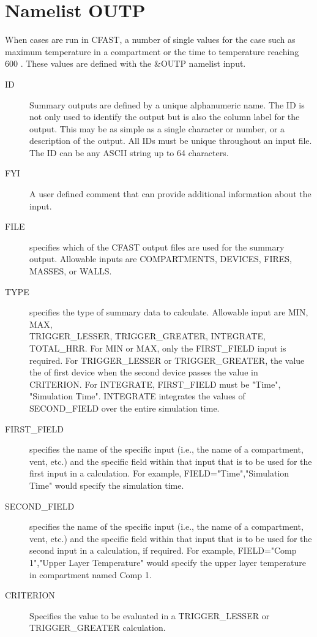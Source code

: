 \documentclass[12pt,twoside]{book}
\begin{document}
\section{Namelist OUTP}

When cases are run in CFAST, a number of single values for the case such as maximum temperature in a compartment or the time to temperature reaching 600 \degc. These values are defined with the {\ct \&OUTP} namelist input.

\begin{description}
  \item[ID] Summary outputs are defined by a unique alphanumeric name. The ID is not only used to identify the output but is also the column label for the output. This may be as simple as a single character or number, or a description of the output. All IDs must be unique throughout an input file.  The { \ct ID} can be any ASCII string up to 64 characters.
  \item[FYI] A user defined comment that can provide additional information about the input.
  \item[FILE] specifies which of the CFAST output files are used for the summary output. Allowable inputs are {\ct COMPARTMENTS}, {\ct DEVICES}, {\ct FIRES}, {\ct MASSES}, or {\ct WALLS}.
  \item[TYPE] specifies the type of summary data to calculate. Allowable input are {\ct MIN}, {\ct MAX}, \\
      {\ct TRIGGER\_LESSER}, {\ct TRIGGER\_GREATER}, {\ct INTEGRATE}, {\ct TOTAL\_HRR}. For {\ct MIN} or {\ct MAX}, only the {\ct FIRST\_FIELD} input is required. For {\ct TRIGGER\_LESSER} or {\ct TRIGGER\_GREATER}, the value the of first device when the second device passes the value in {\ct CRITERION}. For {\ct INTEGRATE}, {\ct FIRST\_FIELD} must be {\ct "Time", "Simulation Time"}. {\ct INTEGRATE} integrates the values of {\ct SECOND\_FIELD} over the entire simulation time.
  \item[FIRST\_FIELD] specifies the name of the specific input (i.e., the name of a compartment, vent, etc.) and the specific field within that input that is to be used for the first input in a calculation. For example, {\ct FIELD="Time","Simulation Time"} would specify the simulation time.
  \item[SECOND\_FIELD] specifies the name of the specific input (i.e., the name of a compartment, vent, etc.) and the specific field within that input that is to be used for the second input in a calculation, if required. For example, {\ct FIELD="Comp 1","Upper Layer Temperature"} would specify the upper layer temperature in compartment named {\ct Comp 1}.
  \item[CRITERION] Specifies the value to be evaluated in a {\ct TRIGGER\_LESSER} or {\ct TRIGGER\_GREATER} calculation.
\end{description}
\end{document}
